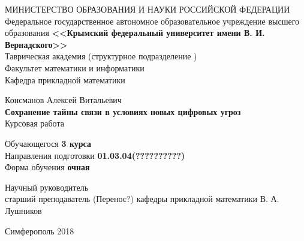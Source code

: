     \begin{titlepage}
    \newpage
	\pagestyle{empty} %
    \begin{center}
    \normalsize МИНИСТЕРСТВО ОБРАЗОВАНИЯ И НАУКИ РОССИЙСКОЙ ФЕДЕРАЦИИ\\ 
    \small  {Федеральное государственное автономное образовательное учреждение высшего образования} 
    \large \textbf{<<Крымский  федеральный  университет имени В. И. Вернадского>>} \\  \vspace{2mm}
    Таврическая академия (структурное подразделение ) \\
    \vspace{2mm}
    Факультет математики и информатики \\
    \vspace{2mm}
    Кафедра прикладной математики 
    \end{center}
    \vspace{3em}

    \begin{center}
	\normalsize Консманов Алексей Витальевич \\
    \LARGE \textbf{Сохранение тайны связи в условиях новых цифровых угроз} \\
    \vspace{1em}
    \normalsize Курсовая работа 
    \end{center}

    \vspace{1em}
    
    \begin{center}
    	\begin{tabbing}	%
    		\hspace{3cm}Обучающегося \hspace{3cm} \textbf{3 курса}\\ %
    		\hspace{3cm}Направления подготовки \hspace{1cm}  \textbf{01.03.04(??????????)}\\
    		\hspace{3cm}Форма обучения \hspace{26mm} \textbf{очная}
    	\end{tabbing}
    
	\vspace {3em}
    \flushleft Научный руководитель \\ старший преподаватель (Перенос?) кафедры прикладной математики \quad В. А. Лушников
	\end{center}
    \vspace{\fill}

    \begin{center}
    Симферополь 2018
    \end{center}

    \end{titlepage}